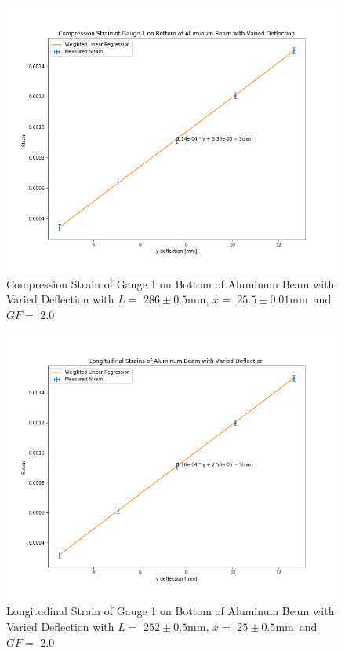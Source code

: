 \documentclass[]{article}
\newcommand{\xOne}{\ensuremath{25.5 \pm 0.01 \si{\milli\meter}}}
\newcommand{\xTop}{\ensuremath{25 \pm 0.5 \si{\milli\meter}}}
\newcommand{\GF}{\ensuremath{2.0}}
\newcommand{\LTwo}{\ensuremath{286 \pm 0.5 \si{\milli\meter}}}
\newcommand{\LThree}{\ensuremath{252 \pm 0.5 \si{\milli\meter}}}
\begin{document}
\newpage
\begin{figure}[hp]
    \includegraphics[width=\textwidth]{../output/graph/compressionStrain.png}
    \caption{Compression Strain of Gauge 1 on Bottom of Aluminum Beam with
    Varied Deflection with $L=$ \LTwo, $x=$ \xOne\ and $GF=$ \GF}\label{fig:compression}
\end{figure}

\newpage
\begin{figure}[hp]
    \includegraphics[width=\textwidth]{../output/graph/longitudinal.png}
    \caption{Longitudinal Strain of Gauge 1 on Bottom of Aluminum Beam with
    Varied Deflection with $L=$ \LThree, $x=$ \xTop\ and $GF=$ \GF}\label{fig:longitudinal}
\end{figure}
\end{document}
